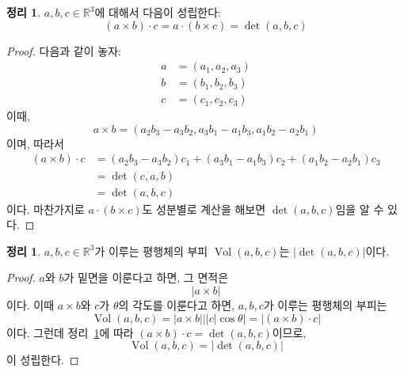 \documentclass[unfonts,oneside,a4paper]{oblivoir}
\theoremstyle{definition}
\theoremstyle{theorem}
\newtheorem{theorem}[definition]{정리}
\theoremstyle{theorem}
\theoremstyle{remark}
\theoremstyle{remark}
\theoremstyle{remark}
\theoremstyle{remark}
\renewcommand{\vec}[1]{\bm{\mathit{#1}}}
\DeclareMathOperator{\Vol}{Vol}
\begin{document}
\begin{theorem} \label{thm:vec_prod_det}
    $\vec a, \vec b, \vec c \in \mathbb R^3$에 대해서 다음이 성립한다:
    \begin{equation*}
        (\vec a \times \vec b) \cdot \vec c = \vec a \cdot (\vec b \times \vec c) = \det(\vec a, \vec b, \vec c)
    \end{equation*}
\end{theorem}
\begin{proof}
    다음과 같이 놓자:
    \begin{align*}
        \vec a &= (a_1, a_2, a_3)\\
        \vec b &= (b_1, b_2, b_3)\\
        \vec c &= (c_1, c_2, c_3)
    \end{align*}
    이때,
    \begin{equation*}
        \vec a \times \vec b = (a_2 b_3 - a_3 b_2, a_3 b_1 - a_1 b_3, a_1 b_2 - a_2 b_1)
    \end{equation*}
    이며, 따라서
    \begin{align*}
        (\vec a \times \vec b) \cdot \vec c &= (a_2 b_3 - a_3 b_2) c_1 + (a_3 b_1 - a_1 b_3) c_2 + (a_1 b_2 - a_2 b_1) c_3\\
                                            &= \det(\vec c, \vec a, \vec b)\\
                                            &= \det(\vec a, \vec b, \vec c)
    \end{align*}
    이다.
    마찬가지로 $\vec a \cdot (\vec b \times \vec c)$도 성분별로 계산을 해보면 $\det(\vec a, \vec b, \vec c)$임을 알 수 있다.
\end{proof}

\begin{theorem}
    $\vec a, \vec b, \vec c \in \mathbb R^3$가 이루는 평행체의 부피 $\Vol (\vec a, \vec b, \vec c)$는 $\lvert\det(\vec a, \vec b, \vec c)\rvert$이다.
\end{theorem}
\begin{proof}
    $\vec a$와 $\vec b$가 밑면을 이룬다고 하면, 그 면적은
    \begin{equation*}
        |\vec a \times \vec b|
    \end{equation*}
    이다.
    이때 $\vec a \times \vec b$와 $\vec c$가 $\theta$의 각도를 이룬다고 하면, $\vec a, \vec b, \vec c$가 이루는 평행체의 부피는
    \begin{equation*}
        \Vol(\vec a, \vec b, \vec c) = |\vec a \times \vec b| \bigl| |\vec c| \cos \theta \bigr| = |(\vec a \times \vec b) \cdot \vec c|
    \end{equation*}
    이다.
    그런데 정리~\ref{thm:vec_prod_det}에 따라 $(\vec a \times \vec b) \cdot \vec c = \det (\vec a, \vec b, \vec c)$이므로,
    \begin{equation*}
        \Vol(\vec a, \vec b, \vec c) = \lvert\det(\vec a, \vec b, \vec c)\rvert
    \end{equation*}
    이 성립한다.
\end{proof}
\end{document}
